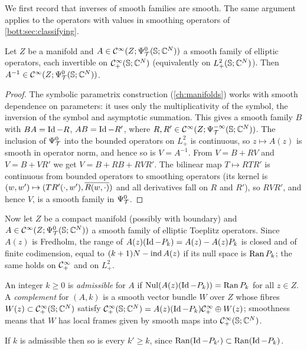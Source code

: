 We first record that inverses of smooth families are smooth. The same argument applies
to the operators with values in smoothing operators of \cref{bott:sec:classifying}.

\begin{lemma}\label{bott:lem:inverse}
  Let $Z$ be a manifold and $A\in\mathcal{C}^\infty(Z;\Psi^{0}_{\mathcal{T}}(\mathbb{S};\mathbb{C}^N))$ a smooth family of
  elliptic operators, each invertible on $\mathcal{C}^\infty_+(\mathbb{S};\mathbb{C}^N)$ (equivalently on
  $L^2_+(\mathbb{S};\mathbb{C}^N)$). Then $A^{-1}\in\mathcal{C}^\infty(Z;\Psi^{0}_{\mathcal{T}}(\mathbb{S};\mathbb{C}^N))$.
\end{lemma}
\begin{proof}
  The symbolic parametrix construction (\cref{ch:manifolds}) works with smooth
  dependence on parameters: it uses only the multiplicativity of the symbol, the
  inversion of the symbol and asymptotic summation. This gives a smooth family
  $B$ with $BA=\operatorname{Id}-R$, $AB=\operatorname{Id}-R'$, where $R,R'\in\mathcal{C}^\infty(Z;\Psi^{-\infty}_{\mathcal{T}}(\mathbb{S};\mathbb{C}^N))$.
  The inclusion of $\Psi^{0}_{\mathcal{T}}$ into the bounded operators on $L^2_+$ is continuous, so
  $z\mapsto A(z)$ is smooth in operator norm, and hence so is $V=A^{-1}$. From
  $V=B+RV$ and $V=B+VR'$ we get $V=B+RB+RVR'$. The bilinear map $T\mapsto RTR'$ is
  continuous from bounded operators to smoothing operators (its kernel is
  $(w,w')\mapsto( TR'(\cdot,w'), \overline{R(w,\cdot)})$ and all derivatives fall on
  $R$ and $R'$), so $RVR'$, and hence $V$, is a smooth family in $\Psi^{0}_{\mathcal{T}}$.
\end{proof}

Now let $Z$ be a compact manifold (possibly with boundary) and
$A\in\mathcal{C}^\infty(Z;\Psi^{0}_{\mathcal{T}}(\mathbb{S};\mathbb{C}^N))$ a smooth family of elliptic Toeplitz operators.
Since $A(z)$ is Fredholm, the range of $A(z)(\operatorname{Id}-P_k)=A(z)-A(z)P_k$ is closed and of
finite codimension, equal to $(k+1)N-\operatorname{ind} A(z)$ if its null space is $\operatorname{Ran} P_k$; the
same holds on $\mathcal{C}^\infty_+$ and on $L^2_+$.

\begin{definition}\label{bott:def:index-data}
  An integer $k\ge0$ is \emph{admissible} for $A$ if $\operatorname{Nul}(A(z)(\operatorname{Id}-P_k))=\operatorname{Ran} P_k$ for
  all $z\in Z$. A \emph{complement} for $(A,k)$ is a smooth vector bundle $W$ over $Z$
  whose fibres $W(z)\subset\mathcal{C}^\infty_+(\mathbb{S};\mathbb{C}^N)$ satisfy
  $\mathcal{C}^\infty_+(\mathbb{S};\mathbb{C}^N)=A(z)(\operatorname{Id}-P_k)\mathcal{C}^\infty_+\oplus W(z)$; smoothness means that $W$ has local
  frames given by smooth maps into $\mathcal{C}^\infty_+(\mathbb{S};\mathbb{C}^N)$.
\end{definition}

If $k$ is admissible then so is every $k'\ge k$, since $\operatorname{Ran}(\operatorname{Id}-P_{k'})\subset\operatorname{Ran}(\operatorname{Id}-P_k)$.

